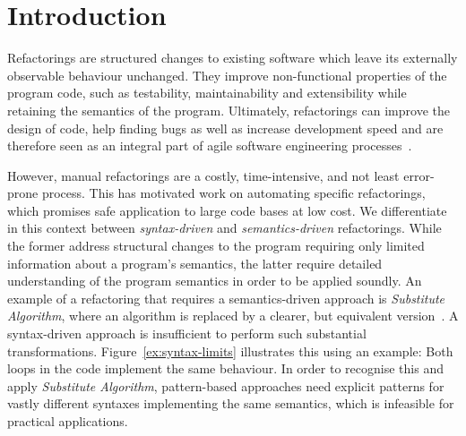 \documentclass[runningheads,a4paper]{llncs}
\begin{document}




\section{Introduction}

Refactorings are structured changes to existing software which leave its
externally observable behaviour unchanged.  They improve non-functional
properties of the program code, such as testability, maintainability and
extensibility while retaining the semantics of the program.  Ultimately,
refactorings can improve the design of code, help finding bugs as well
as increase development speed and are therefore seen as an integral part
of agile software engineering processes~\cite{DBLP:conf/xpu/Kerievsky04b,
Fowler1999}.

However, manual refactorings are a costly, time-intensive, and not least
error-prone process.  This has motivated work on automating specific
refactorings, which promises safe application to large code bases at low
cost.  We differentiate in this context between {\em syntax-driven} and {\em
semantics-driven} refactorings.  While the former address structural changes
to the program requiring only limited information about a program's
semantics, the latter require detailed understanding of the program
semantics in order to be applied soundly.  An example of a refactoring that
requires a semantics-driven approach is {\em Substitute Algorithm}, where an
algorithm is replaced by a clearer, but equivalent
version~\cite{Fowler1999}.
%
%
A syntax-driven approach is insufficient to perform such substantial
transformations.  Figure~\ref{ex:syntax-limits} illustrates this using an
example: Both loops in the code implement the same behaviour.  In order to
recognise this and apply {\em Substitute Algorithm}, pattern-based
approaches need explicit patterns for vastly different syntaxes implementing
the same semantics, which is infeasible for practical applications.

\end{document}
